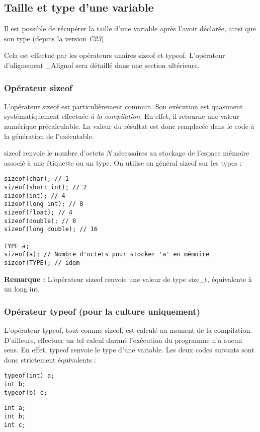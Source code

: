 \documentclass[../../../main.tex]{subfiles}
\begin{document}
\subsection{Taille et type d'une variable}
Il est possible de récupérer la taille d'une variable après l'avoir déclarée, ainsi que son type (depuis la version \textit{C23})
 
Cela est effectué par les opérateurs unaires \textsf{sizeof} et \textsf{typeof}. L'opérateur d'alignement \textsf{\_Alignof} sera détaillé dans une section ultérieure.
 
\subsubsection{Opérateur \textsf{sizeof}}
 
L'opérateur \textsf{sizeof} est particulièrement commun. Son exécution est quasiment systématiquement effectuée \textit{à la compilation}. En effet, il retourne une valeur numérique précalculable. La valeur du résultat est donc remplacée dans le code à la génération de l'exécutable.
 
\textsf{sizeof} renvoie le nombre d'octets $N$ nécessaires au stockage de l'espace mémoire associé à une étiquette ou un type. On utilise en général \textsf{sizeof} sur les types :
\begin{verbatim}
sizeof(char); // 1
sizeof(short int); // 2
sizeof(int); // 4
sizeof(long int); // 8
sizeof(float); // 4
sizeof(double); // 8
sizeof(long double); // 16

TYPE a;
sizeof(a); // Nombre d'octets pour stocker 'a' en mémoire
sizeof(TYPE); // idem
\end{verbatim}
\textbf{Remarque :} L'opérateur \textsf{sizeof} renvoie une valeur de type \textsf{size\_t}, équivalente à un \textsf{long int}.

\subsubsection{Opérateur \textsf{typeof} (pour la culture uniquement)}
L'opérateur \textsf{typeof}, tout comme \textsf{sizeof}, est calculé au moment de la compilation. D'ailleurs, effectuer un tel calcul durant l'exécution du programme n'a aucun sens. En effet, \textsf{typeof} renvoie le type d'une variable. Les deux codes suivants sont donc strictement équivalents : 

\begin{minipage}{0.5\textwidth}
\begin{verbatim}
typeof(int) a;
int b;
typeof(b) c;
\end{verbatim}
\end{minipage}
\begin{minipage}{0.5\textwidth}
\begin{verbatim}
int a;
int b;
int c;
\end{verbatim}
\end{minipage}
\end{document}
